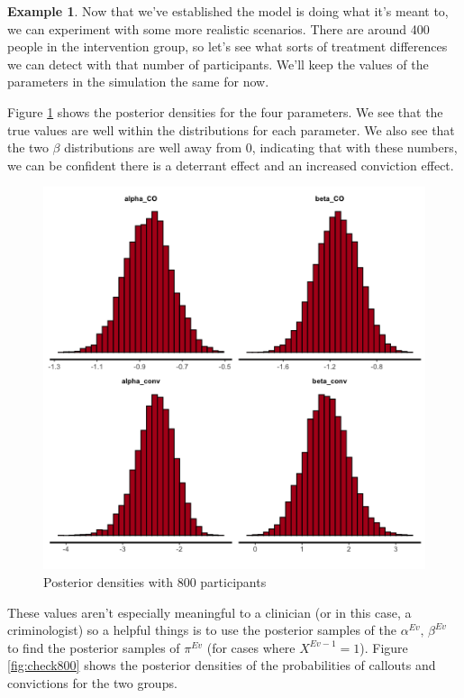 \documentclass[
  openany]{book}
\theoremstyle{definition}
\theoremstyle{definition}
\newtheorem{example}{Example}[chapter]
\theoremstyle{definition}
\theoremstyle{definition}
\theoremstyle{remark}
\begin{document}
\begin{example}
Now that we've established the model is doing what it's meant to, we can experiment with some more realistic scenarios.
There are around 400 people in the intervention group, so let's see what sorts of treatment differences we can detect with that number of participants. We'll keep the values of the parameters in the simulation the same for now.

Figure \ref{fig:par800} shows the posterior densities for the four parameters. We see that the true values are well within the distributions for each parameter. We also see that the two \(\beta\) distributions are well away from 0, indicating that with these numbers, we can be confident there is a deterrant effect and an increased conviction effect.

\begin{figure}
\centering
\includegraphics{images/ggpostparam800.png}
\caption{\label{fig:par800}Posterior densities with 800 participants}
\end{figure}

These values aren't especially meaningful to a clinician (or in this case, a criminologist) so a helpful things is to use the posterior samples of the \(\alpha^{Ev},\,\beta^{Ev}\) to find the posterior samples of \(\pi^{Ev}\) (for cases where \(X^{Ev-1}=1\)).
Figure \ref{fig:check800} shows the posterior densities of the probabilities of callouts and convictions for the two groups.


\end{example}
\end{document}
